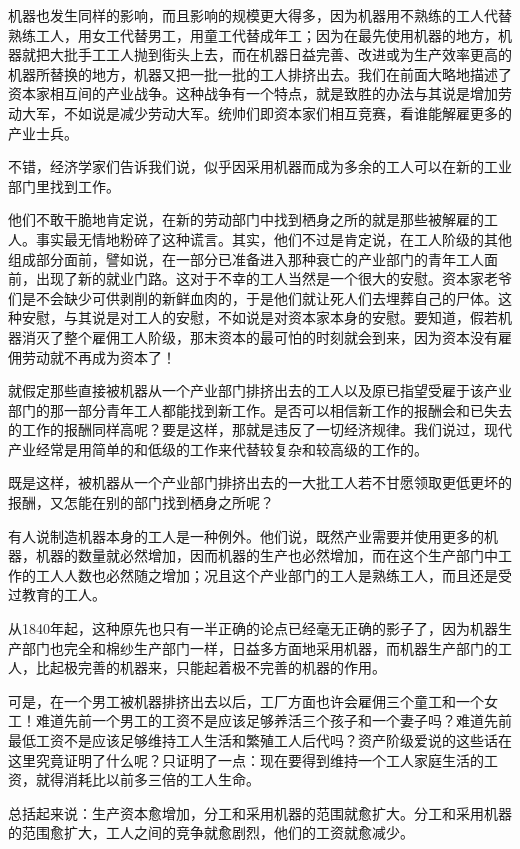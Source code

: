 \documentclass[a4paper,twoside,12pt,AutoFakeBold]{ctexart}
\begin{document}
机器也发生同样的影响，而且影响的规模更大得多，因为机器用不熟练的工人代替熟练工人，用女工代替男工，用童工代替成年工；因为在最先使用机器的地方，机器就把大批手工工人抛到街头上去，而在机器日益完善、改进或为生产效率更高的机器所替换的地方，机器又把一批一批的工人排挤出去。我们在前面大略地描述了资本家相互间的产业战争。这种战争有一个特点，就是致胜的办法与其说是增加劳动大军，不如说是减少劳动大军。统帅们即资本家们相互竞赛，看谁能解雇更多的产业士兵。

不错，经济学家们告诉我们说，似乎因采用机器而成为多余的工人可以在新的工业部门里找到工作。

他们不敢干脆地肯定说，在新的劳动部门中找到栖身之所的就是那些被解雇的工人。事实最无情地粉碎了这种谎言。其实，他们不过是肯定说，在工人阶级的其他组成部分面前，譬如说，在一部分已准备进入那种衰亡的产业部门的青年工人面前，出现了新的就业门路。这对于不幸的工人当然是一个很大的安慰。资本家老爷们是不会缺少可供剥削的新鲜血肉的，于是他们就让死人们去埋葬自己的尸体。这种安慰，与其说是对工人的安慰，不如说是对资本家本身的安慰。要知道，假若机器消灭了整个雇佣工人阶级，那末资本的最可怕的时刻就会到来，因为资本没有雇佣劳动就不再成为资本了！

就假定那些直接被机器从一个产业部门排挤出去的工人以及原已指望受雇于该产业部门的那一部分青年工人都能找到新工作。是否可以相信新工作的报酬会和已失去的工作的报酬同样高呢？要是这样，那就是违反了一切经济规律。我们说过，现代产业经常是用简单的和低级的工作来代替较复杂和较高级的工作的。

既是这样，被机器从一个产业部门排挤出去的一大批工人若不甘愿领取更低更坏的报酬，又怎能在别的部门找到栖身之所呢？

有人说制造机器本身的工人是一种例外。他们说，既然产业需要并使用更多的机器，机器的数量就必然增加，因而机器的生产也必然增加，而在这个生产部门中工作的工人人数也必然随之增加；况且这个产业部门的工人是熟练工人，而且还是受过教育的工人。

从1840年起，这种原先也只有一半正确的论点已经毫无正确的影子了，因为机器生产部门也完全和棉纱生产部门一样，日益多方面地采用机器，而机器生产部门的工人，比起极完善的机器来，只能起着极不完善的机器的作用。

可是，在一个男工被机器排挤出去以后，工厂方面也许会雇佣三个童工和一个女工！难道先前一个男工的工资不是应该足够养活三个孩子和一个妻子吗？难道先前最低工资不是应该足够维持工人生活和繁殖工人后代吗？资产阶级爱说的这些话在这里究竟证明了什么呢？只证明了一点：现在要得到维持一个工人家庭生活的工资，就得消耗比以前多三倍的工人生命。

总括起来说：生产资本愈增加，分工和采用机器的范围就愈扩大。分工和采用机器的范围愈扩大，工人之间的竞争就愈剧烈，他们的工资就愈减少。
\end{document}
